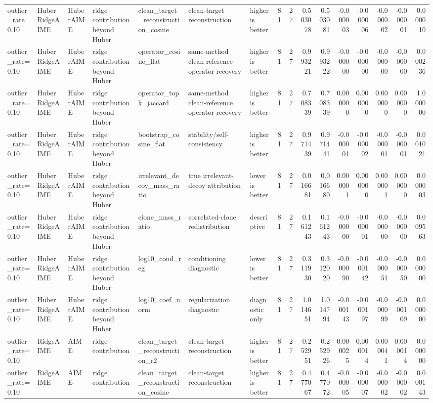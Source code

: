 \begin{table}[t]
\begin{tabular}{lllllllrrrrrrrrr}
outlier_rate=0.10 & HuberRidgeAIME & HuberAIME & ridge contribution beyond Huber & clean_target_reconstruction_cosine & clean-target reconstruction & higher is better & 81 & 27 & 0.503078 & 0.503081 & -0.000003 & -0.000006 & -0.000002 & -0.000001 & 0.000010 \\
outlier_rate=0.10 & HuberRidgeAIME & HuberAIME & ridge contribution beyond Huber & operator_cosine_flat & same-method clean-reference operator recovery & higher is better & 81 & 27 & 0.993221 & 0.993222 & -0.000000 & -0.000000 & -0.000000 & -0.000000 & 0.000236 \\
outlier_rate=0.10 & HuberRidgeAIME & HuberAIME & ridge contribution beyond Huber & operator_topk_jaccard & same-method clean-reference operator recovery & higher is better & 81 & 27 & 0.708339 & 0.708339 & 0.000000 & 0.000000 & 0.000000 & 0.000000 & 1.000000 \\
outlier_rate=0.10 & HuberRidgeAIME & HuberAIME & ridge contribution beyond Huber & bootstrap_cosine_flat & stability/self-consistency & higher is better & 81 & 27 & 0.971439 & 0.971441 & -0.000001 & -0.000002 & -0.000001 & -0.000001 & 0.001021 \\
outlier_rate=0.10 & HuberRidgeAIME & HuberAIME & ridge contribution beyond Huber & irrelevant_decoy_mass_ratio & true irrelevant-decoy attribution & lower is better & 81 & 27 & 0.016681 & 0.016680 & 0.000001 & 0.000000 & 0.000001 & 0.000000 & 0.000003 \\
outlier_rate=0.10 & HuberRidgeAIME & HuberAIME & ridge contribution beyond Huber & clone_mass_ratio & correlated-clone redistribution & descriptive & 81 & 27 & 0.161243 & 0.161243 & -0.000000 & -0.000001 & -0.000000 & -0.000000 & 0.009563 \\
outlier_rate=0.10 & HuberRidgeAIME & HuberAIME & ridge contribution beyond Huber & log10_cond_reg & conditioning diagnostic & lower is better & 81 & 27 & 0.311930 & 0.312020 & -0.000090 & -0.000142 & -0.000051 & -0.000050 & 0.000000 \\
outlier_rate=0.10 & HuberRidgeAIME & HuberAIME & ridge contribution beyond Huber & log10_coef_norm & regularization diagnostic & diagnostic only & 81 & 27 & 1.014651 & 1.014794 & -0.000143 & -0.000197 & -0.000099 & -0.000109 & 0.000000 \\
outlier_rate=0.10 & RidgeAIME & AIME & ridge contribution & clean_target_reconstruction_r2 & clean-target reconstruction & higher is better & 81 & 27 & 0.252951 & 0.252926 & 0.000025 & 0.000014 & 0.000041 & 0.000014 & 0.000000 \\
outlier_rate=0.10 & RidgeAIME & AIME & ridge contribution & clean_target_reconstruction_cosine & clean-target reconstruction & higher is better & 81 & 27 & 0.477067 & 0.477072 & -0.000005 & -0.000007 & -0.000002 & -0.000002 & 0.000143 \\

\end{tabular}
\end{table}
